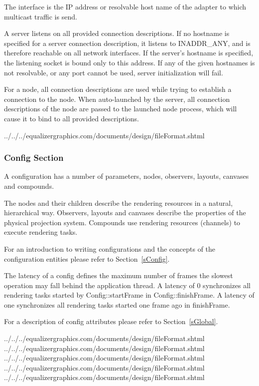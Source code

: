 \documentclass[10pt,a4]{scrartcl}
\newcommand{\sref}[1]{Section~\ref{#1}}
\begin{document}
The interface is the IP address or resolvable host name of the adapter to which
multicast traffic is send.

A server listens on all provided connection descriptions. If no hostname
is specified for a server connection description, it listens to
INADDR\_ANY, and is therefore reachable on all network interfaces. If
the server's hostname is specified, the listening socket is bound only
to this address. If any of the given hostnames is not resolvable, or any
port cannot be used, server initialization will fail.

For a node, all connection descriptions are used while trying to
establish a connection to the node. When auto-launched by the server,
all connection descriptions of the node are passed to the launched node
process, which will cause it to bind to all provided descriptions.

{\footnotesize
  {../../../equalizergraphics.com/documents/design/fileFormat.shtml}}

\subsubsection{Config Section}

A configuration has a number of parameters, nodes, observers, layouts,
canvases and compounds.

The nodes and their children describe the rendering resources in a
natural, hierarchical way. Observers, layouts and canvases describe the
properties of the physical projection system. Compounds use rendering
resources (channels) to execute rendering tasks.

For an introduction to writing configurations and the concepts of the
configuration entities please refer to \sref{sConfig}.

The latency of a config defines the maximum number of frames the
slowest operation may fall behind the application thread. A latency of 0
synchronizes all rendering tasks started by \textsf{Config::startFrame}
in \textsf{Config::finishFrame}. A latency of one synchronizes all
rendering tasks started one frame ago in \textsf{finishFrame}.

For a description of config attributes please refer to \sref{sGlobal}.

{\footnotesize
  {../../../equalizergraphics.com/documents/design/fileFormat.shtml}}
{\footnotesize
  {../../../equalizergraphics.com/documents/design/fileFormat.shtml}}
{\footnotesize
  {../../../equalizergraphics.com/documents/design/fileFormat.shtml}}
{\footnotesize
  {../../../equalizergraphics.com/documents/design/fileFormat.shtml}}
{\footnotesize
  {../../../equalizergraphics.com/documents/design/fileFormat.shtml}}
\end{document}
